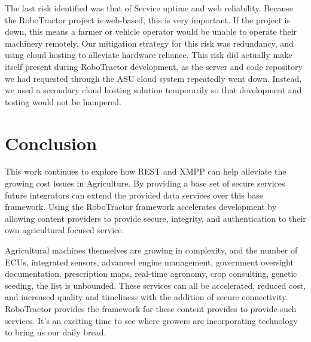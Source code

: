 \documentclass[conference,12pt]{IEEEtran}
\begin{document}
The last risk identified was that of Service uptime and web reliability. Because the RoboTractor project is web-based, this is very important. If the project is down, this means a farmer or vehicle operator would be unable to operate their machinery remotely. Our mitigation strategy for this risk was redundancy, and using cloud hosting to alleviate hardware reliance. This risk did actually make itself present during RoboTractor development, as the server and code repository we had requested through the ASU cloud system repeatedly went down. Instead, we used a secondary cloud hosting solution temporarily so that development and testing would not be hampered. 

\section{Conclusion}
This work continues to explore how REST and XMPP can help alleviate the growing
cost issues in Agriculture. By providing a base set of secure services future
integrators can extend the provided data services over this base framework.
Using the RoboTractor framework accelerates development by allowing content
providers to provide secure, integrity, and authentication to their own
agricultural focused service. 

Agricultural machines themselves are growing in complexity, and the number of ECUs,
integrated sensors, advanced engine management, government oversight
documentation, prescription maps, real-time agronomy, crop consulting, genetic
seeding, the list is unbounded. These services can all be accelerated, reduced
cost, and increased quality and timeliness with the addition of secure
connectivity. RoboTractor provides the framework for these content provides to
provide such services. It's an exciting time to see where growers are
incorporating technology to bring us our daily bread.
\end{document}
